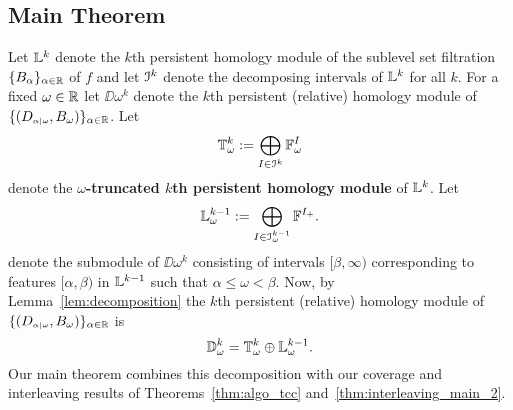 %

\subsection{Main Theorem}

Let $\mathbb{L}^k$ denote the $k$th persistent homology module of the sublevel set filtration $\{B_\alpha\}_{\alpha\in\mathbb{R}}$ of $f$ and let $\mathcal{I}^k$ denote the decomposing intervals of $\mathbb{L}^k$ for all $k$.
For a fixed $\omega\in\mathbb{R}$ let $\DD{\omega}^k$ denote the $k$th persistent (relative) homology module of $\{(D_{\scriptscriptstyle \alpha\mid \omega},B_\omega)\}_{\alpha\in\mathbb{R}}$.
Let
\[\mathbb{T}_\omega^k := \bigoplus_{I\in\mathcal{I}^k} \mathbb{F}_\omega^I\]
denote the \textbf{$\omega$-truncated $k$th persistent homology module} of $\mathbb{L}^k$.
Let
\[ \mathbb{L}_\omega^{k-1} := \bigoplus_{I\in \mathcal{I}_\omega^{k-1}} \mathbb{F}^{I_+}.\]
denote the submodule of $\DD{\omega}^k$ consisting of intervals $[\beta,\infty)$ corresponding to features $[\alpha,\beta)$ in $\mathbb{L}^{k-1}$ such that $\alpha\leq\omega <\beta$.
Now, by Lemma~\ref{lem:decomposition} the $k$th persistent (relative) homology module of $\{(D_{\scriptscriptstyle \alpha\mid \omega}, B_\omega)\}_{\alpha\in\mathbb{R}}$ is
\[ \mathbb{D}_{\omega}^k = \mathbb{T}_\omega^k\oplus \mathbb{L}_\omega^{k-1}.\]
Our main theorem combines this decomposition with our coverage and interleaving results of Theorems~\ref{thm:algo_tcc} and~\ref{thm:interleaving_main_2}.%

